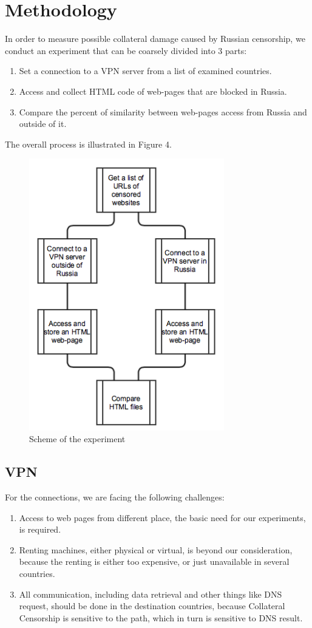 \documentclass[conference]{IEEEtran}
\begin{document}
\section{Methodology}
In order to measure possible collateral damage caused by Russian censorship, we conduct an experiment that can be coarsely divided into 3 parts:
\begin{enumerate}
    \item Set a connection to a VPN server from a list of examined countries.
    \item Access and collect HTML code of web-pages that are blocked in Russia.
    \item Compare the percent of similarity between web-pages access from Russia and outside of it.
\end{enumerate}
The overall process is illustrated in Figure 4.
\begin{figure}[H]
    \centering
    \includegraphics[width=85mm]{diag1.png}
    \caption{Scheme of the experiment \label{diag1}}
    \label{fig:fig4}
\end{figure}

\subsection{VPN}

For the connections, we are facing the following challenges:
\begin{enumerate}
    \item Access to web pages from different place, the basic need for our experiments, is required.
    \item Renting machines, either physical or virtual, is beyond our consideration, because the renting is either too expensive, or just unavailable in several countries.
    \item All communication, including data retrieval and other things like DNS request, should be done in the destination countries, because Collateral Censorship is sensitive to the path, which in turn is sensitive to DNS result.
\end{enumerate}
\end{document}
